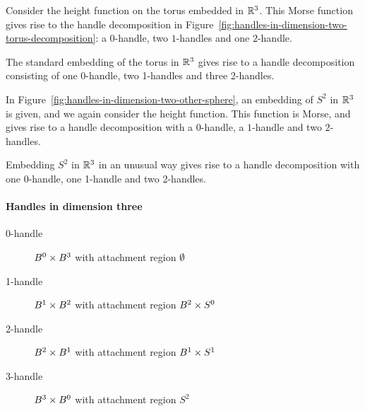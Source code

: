 \begin{eg}
    Consider the height function on the torus embedded in $\mathbb{R}^3$. This Morse function gives rise to the handle decomposition in Figure~\ref{fig:handles-in-dimension-two-torus-decomposition}: a $0$-handle, two $1$-handles and one $2$-handle.
\end{eg}

\begin{marginfigure}
    \centering
    \caption{The standard embedding of the torus in $\mathbb{R}^3$ gives rise to a handle decomposition consisting of one  0-handle, two 1-handles and three 2-handles.}
    \label{fig:handles-in-dimension-two-torus-decomposition}
\end{marginfigure}

\begin{eg}
    In Figure~\ref{fig:handles-in-dimension-two-other-sphere}, an embedding of $S^2$ in $\mathbb{R}^3$ is given, and we again consider the height function.
    This function is Morse, and gives rise to a handle decomposition with a $0$-handle, a $1$-handle and two $2$-handles.
\end{eg}
\begin{marginfigure}
    \centering
    \caption{Embedding $S^2$ in $ \mathbb{R}^3$ in an unusual way gives rise to a handle decomposition with one 0-handle, one 1-handle and two 2-handles. }
    \label{fig:handles-in-dimension-two-other-sphere}
\end{marginfigure}



\paragraph{Handles in dimension three}


\begin{description}
    \item[0-handle] $ B^{0} \times B^{3}$ with attachment region $\emptyset$ 
        \hfill{}
    \item[1-handle] $ B^{1} \times B^{2}$ with attachment region $ B^{2} \times S^{0}$
        \hfill{}
    \item[2-handle] $ B^{2} \times B^{1}$ with attachment region $ B^{1} \times S^1$
        \hfill{}
    \item[3-handle] $ B^{3} \times B^{0}$ with attachment region $S^{2}$
        \hfill{}
\end{description}

